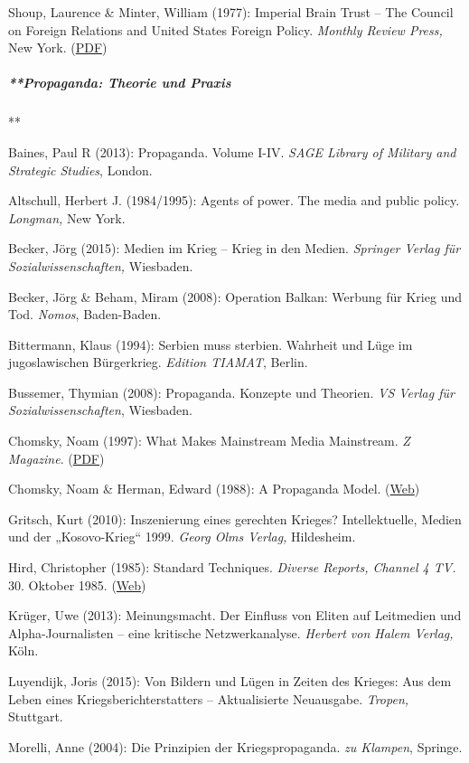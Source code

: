 Shoup, Laurence \& Minter, William (1977): Imperial Brain Trust -- The
Council on Foreign Relations and United States Foreign Policy.
\emph{Monthly Review Press,} New York.
(\href{https://swprs.files.wordpress.com/2017/09/cfr_imperial_brain_trust.pdf}{PDF})

\hypertarget{propaganda-theorie-und-praxis}{%
\subparagraph{**Propaganda: Theorie und
Praxis}\label{propaganda-theorie-und-praxis}}

**

Baines, Paul R (2013): Propaganda. Volume I-IV. \emph{SAGE Library of
Military and Strategic Studies}, London.

Altschull, Herbert J. (1984/1995): Agents of power. The media and public
policy. \emph{Longman,} New York.

Becker, Jörg (2015): Medien im Krieg -- Krieg in den Medien.
\emph{Springer Verlag für Sozialwissenschaften,} Wiesbaden.

Becker, Jörg \& Beham, Miram (2008): Operation Balkan: Werbung für Krieg
und Tod. \emph{Nomos}, Baden-Baden.

Bittermann, Klaus (1994): Serbien muss sterbien. Wahrheit und Lüge im
jugoslawischen Bürgerkrieg. \emph{Edition TIAMAT}, Berlin.

Bussemer, Thymian (2008): Propaganda. Konzepte und Theorien. \emph{VS
Verlag für Sozialwissenschaften}, Wiesbaden.

Chomsky, Noam (1997): What Makes Mainstream Media Mainstream. \emph{Z
Magazine}. (\href{https://chomsky.info/199710__/}{PDF})

Chomsky, Noam \& Herman, Edward (1988): A Propaganda Model.
(\href{https://chomsky.info/consent01/}{Web})

Gritsch, Kurt (2010): Inszenierung eines gerechten Krieges?
Intellektuelle, Medien und der „Kosovo-Krieg`` 1999. \emph{Georg Olms
Verlag,} Hildesheim.

Hird, Christopher (1985): Standard Techniques. \emph{Diverse Reports,
Channel 4 TV.} 30. Oktober 1985.
(\href{https://swprs.org/video-the-cia-and-the-media/}{Web})

Krüger, Uwe (2013): Meinungsmacht. Der Einfluss von Eliten auf
Leitmedien und Alpha-Journalisten -- eine kritische Netzwerkanalyse.
\emph{Herbert von Halem Verlag,} Köln.

Luyendijk, Joris (2015): Von Bildern und Lügen in Zeiten des Krieges:
Aus dem Leben eines Kriegsberichterstatters -- Aktualisierte Neuausgabe.
\emph{Tropen,} Stuttgart.

Morelli, Anne (2004): Die Prinzipien der Kriegspropaganda. \emph{zu
Klampen}, Springe.

